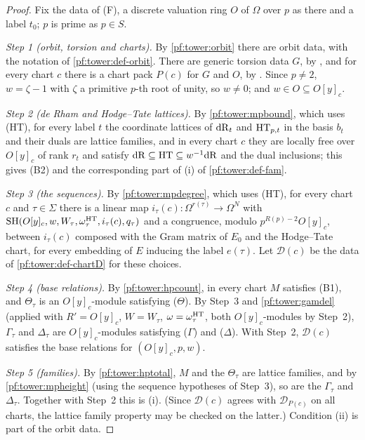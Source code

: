 \begin{proof}
Fix the data of (F), a discrete valuation ring $O$ of $\Omega$ over $p$ as there and a label $t_0$; $p$ is prime as
$p\in S$.

\emph{Step 1 (orbit, torsion and charts).} By \cref{pf:tower:orbit} there are orbit data, with the notation of
\cref{pf:tower:def-orbit}. There are generic torsion data $G$, by
, and for every chart $c$ there is a chart pack $P(c)$ for $G$
and $O$, by .
Since $p\ne2$, $w=\zeta-1$ with $\zeta$ a primitive $p$-th root of unity, so $w\ne0$; and $w\in O\subseteq O[y]_c$.

\emph{Step 2 (de Rham and Hodge--Tate lattices).} By \cref{pf:tower:mpbound}, which
uses (HT), for every label $t$ the coordinate lattices of $\mathrm{dR}_t$ and $\mathrm{HT}_{p,t}$ in the basis $b_t$ and their
duals are lattice families, and in every chart $c$ they are locally free over $O[y]_c$ of rank $r_t$ and satisfy
$\mathrm{dR}\subseteq\mathrm{HT}\subseteq w^{-1}\mathrm{dR}$ and the dual inclusions; this gives (B2) and the corresponding part of
(i) of \cref{pf:tower:def-fam}.

\emph{Step 3 (the sequences).} By \cref{pf:tower:mpdegree}, which uses (HT), for every
chart $c$ and $\tau\in\Sigma$ there is a linear map $i_\tau(c)\colon\Omega^{r(\tau)}\to\Omega^N$ with
$\mathrm{SH}(O[y]_c,w,W_\tau,\omega^{\mathrm{HT}}_\tau,i_\tau(c),q_\tau)$ and a congruence, modulo $p^{R(p)-2}O[y]_c$,
between $i_\tau(c)$ composed with the Gram matrix of $E_0$ and the Hodge--Tate chart, for every embedding of $E$ inducing
the label $e(\tau)$. Let $\mathcal D(c)$ be the data of \cref{pf:tower:def-chartD} for these choices.

\emph{Step 4 (base relations).} By \cref{pf:tower:hpcount}, in every chart $M$ satisfies
(B1), and $\Theta_\tau$ is an $O[y]_c$-module satisfying ($\Theta$). By Step~3 and \cref{pf:tower:gamdel} (applied with
$R'=O[y]_c$, $W=W_\tau$, $\omega=\omega^{\mathrm{HT}}_\tau$, both $O[y]_c$-modules by Step~2), $\Gamma_\tau$ and
$\Delta_\tau$ are $O[y]_c$-modules satisfying ($\Gamma$) and ($\Delta$). With Step~2, $\mathcal D(c)$ satisfies the base
relations for $(O[y]_c,p,w)$.

\emph{Step 5 (families).} By \cref{pf:tower:hptotal}, $M$ and the $\Theta_\tau$ are lattice
families, and by \cref{pf:tower:mpheight} (using the sequence hypotheses of Step~3), so
are the $\Gamma_\tau$ and $\Delta_\tau$. Together with Step~2 this is (i). (Since $\mathcal D(c)$ agrees with
$\mathcal D_{P(c)}$ on all charts, the lattice family property may be checked on the latter.) Condition (ii) is part of
the orbit data.


\end{proof}
